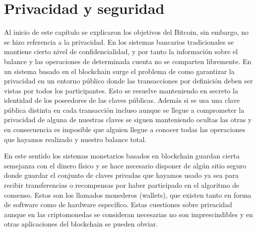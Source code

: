 

\section{Privacidad y seguridad}\label{cap3:seguridad} %
Al inicio de este capítulo se explicaron los objetivos del Bitcoin, sin embargo, no se hizo referencia a la privacidad. En los sistemas bancarios tradicionales se mantiene cierto nivel de confidencialidad, y por tanto la información sobre el balance y las operaciones de determinada cuenta no se comparten libremente. En un sistema basado en el blockchain surge el problema de como garantizar la privacidad en un entorno público donde las transacciones por definición deben ser vistas por todos los participantes. Esto se resuelve manteniendo en secreto la identidad de los poseedores de las  claves públicas. Además si se usa una clave pública distinta en cada transacción incluso aunque se llegue a comprometer la privacidad de alguna de nuestras claves se siguen manteniendo ocultas las otras y en consecuencia es imposible que alguien llegue a conocer todas las operaciones que hayamos realizado y nuestro balance total. 

En este sentido los sistemas monetarios basados en blockchain guardan cierta semejanza con el dinero físico y se hace necesario disponer de algún sitio seguro donde guardar el conjunto de claves privadas que hayamos usado ya sea para recibir transferencias o recompensas por haber participado en el algoritmo de consenso. Estos son los llamados monederos (wallets), que existen tanto en forma de software como de hardware específico.
Estas cuestiones sobre privacidad aunque en las criptomonedas se consideran necesarias no son imprescindibles y en otras aplicaciones del blockchain se pueden obviar.


